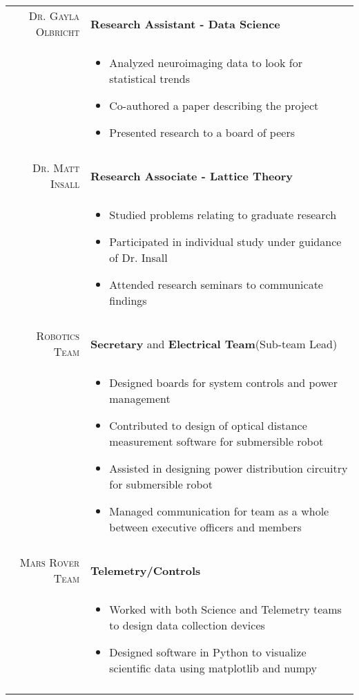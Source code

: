 \documentclass[a4paper,10pt]{article}
\newcommand{\br}{\\\multicolumn{2}{c}{}}
\begin{document}
\begin{tabular}{r|p{15cm}}
    \textsc{Dr. Gayla Olbricht} & \textbf{Research Assistant - Data Science} \\
     & \begin{itemize}
    \item Analyzed neuroimaging data to look for statistical trends
    \item Co-authored a paper describing the project
    \item Presented research to a board of peers
    \end{itemize} \br\\

    \textsc{Dr. Matt Insall} & \textbf{Research Associate - Lattice Theory} \\
     & \begin{itemize}
    \item Studied problems relating to graduate research
    \item Participated in individual study under guidance of Dr. Insall
    \item Attended research seminars to communicate findings
    \end{itemize} \br\\

    \textsc{Robotics Team} & \textbf{Secretary} and \textbf{Electrical Team}(Sub-team Lead) \\
     & \begin{itemize}
     \item Designed boards for system controls and power management
     \item Contributed to design of optical distance measurement software for submersible robot
     \item Assisted in designing power distribution circuitry for submersible robot
     \item Managed communication for team as a whole between executive officers and members
    \end{itemize} \br\\

    \textsc{Mars Rover Team} & \textbf{Telemetry/Controls} \\
     & \begin{itemize}
     \item{Worked with both Science and Telemetry teams to design data collection devices}
     \item{Designed software in Python to visualize scientific data using matplotlib and numpy}
     \end{itemize} \br\\


\end{tabular}
\end{document}
